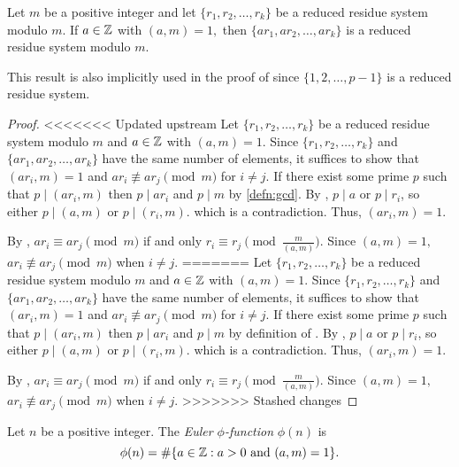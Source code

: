 \documentclass{ximera}
\begin{document}
\begin{lemma}\label{lem:reduced-sys}
    Let $m$ be a positive integer and let $\{r_1,r_2,\dots,r_k\}$ be a reduced residue system modulo $m.$ If $a\in\mathbb Z$ with $(a,m)=1,$ then $\{ar_1,ar_2,\dots,ar_k\}$ is a reduced residue system modulo $m.$
\end{lemma}
This result is also implicitly used in the proof of  since $\{1,2,\dots,p-1\}$ is a reduced residue system.

\begin{proof}
<<<<<<< Updated upstream
    Let $\{r_1,r_2,\dots,r_k\}$ be a reduced residue system modulo $m$ and $a\in\mathbb Z$ with $(a,m)=1.$ Since $\{r_1,r_2,\dots,r_k\}$ and $\{ar_1,ar_2,\dots,ar_k\}$ have the same number of elements, it suffices to show that $(ar_i,m)=1$ and  $ar_i\not\equiv ar_j\pmod{m}$ for $i\neq j.$ If there exist some prime $p$ such that $p\mid(ar_i,m)$ then $p\mid ar_i$ and $p\mid m$ by \autoref{defn:gcd}. By , $p\mid a$ or $p\mid r_i$, so either $p\mid (a,m)$ or $p\mid (r_i,m).$ which is a contradiction. Thus, $(ar_i,m)=1.$

    By , $ar_i\equiv ar_j\pmod{m}$ if and only $r_i\equiv r_j \pmod{\tfrac{m}{(a,m)}}.$ Since $(a,m)=1,$ $ar_i\not\equiv ar_j\pmod{m}$ when $i\neq j$.
=======
    Let $\{r_1,r_2,\dots,r_k\}$ be a reduced residue system modulo $m$ and $a\in\mathbb Z$ with $(a,m)=1.$ Since $\{r_1,r_2,\dots,r_k\}$ and $\{ar_1,ar_2,\dots,ar_k\}$ have the same number of elements, it suffices to show that $(ar_i,m)=1$ and  $ar_i\not\equiv ar_j\pmod{m}$ for $i\neq j.$ If there exist some prime $p$ such that $p\mid(ar_i,m)$ then $p\mid ar_i$ and $p\mid m$ by definition of . By , $p\mid a$ or $p\mid r_i$, so either $p\mid (a,m)$ or $p\mid (r_i,m).$ which is a contradiction. Thus, $(ar_i,m)=1.$

    By , $ar_i\equiv ar_j\pmod{m}$ if and only $r_i\equiv r_j \pmod{\tfrac{m}{(a,m)}}.$ Since $(a,m)=1,$ $ar_i\not\equiv ar_j\pmod{m}$ when $i\neq j$.
>>>>>>> Stashed changes
\end{proof}


\begin{defn}\label{defn:phi-fn}
    Let $n$ be a positive integer. The \emph{Euler $\phi$-function} $\phi(n)$ is \[\phi(n)=\#\{a\in\mathbb Z : a>0 \textnormal{ and } (a,m)=1\}.\]
\end{defn}
\end{document}
